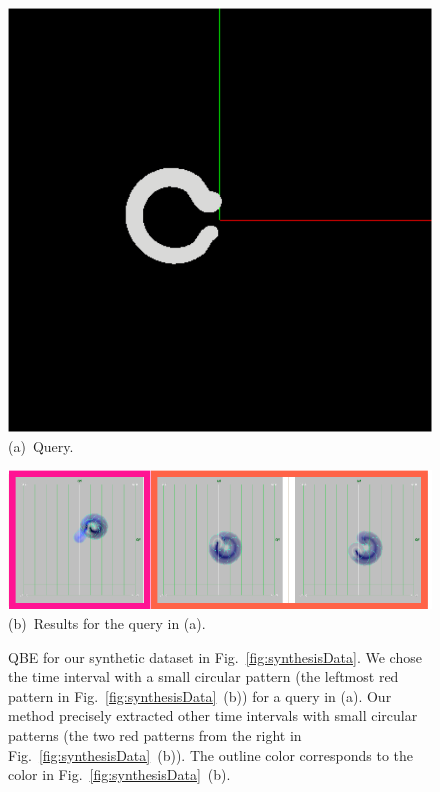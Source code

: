 \begin{figure}[tb]
    \centering
    \begin{minipage}{0.24\linewidth}
        \centering
        \includegraphics[width=.99\linewidth]{vgtc_journal_latex/figures/QBE.png}
        \footnotesize{\sf (a)~Query.}
    \end{minipage}
    \begin{minipage}{0.75\linewidth}
        \centering
        \includegraphics[width=.99\linewidth]{vgtc_journal_latex/figures/QBEdemodataResults_revised.png}
        \footnotesize{\sf(b)~Results for the query in (a).}
    \end{minipage}
    \caption{QBE for our synthetic dataset in Fig.~\ref{fig:synthesisData}. 
        We chose the time interval with a small circular pattern (the leftmost red pattern in Fig.~\ref{fig:synthesisData}~(b)) for a query in (a). 
        Our method precisely extracted other time intervals with small circular patterns (the two red patterns from the right in Fig.~\ref{fig:synthesisData}~(b)).
        The outline color corresponds to the color in Fig.~\ref{fig:synthesisData}~(b).}
    \label{fig:QBEDemodata}
\end{figure}
